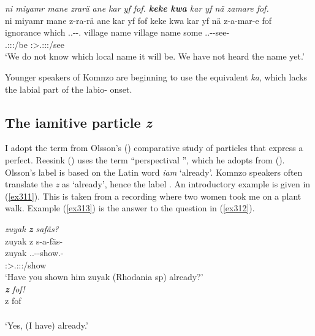 \begin{exe}
	\ex \emph{ni miyamr mane zrarä ane kar yf fof. \textbf{keke kwa} kar yf nä zamare fof.}\\
	\glll ni miyamr mane z-ra-rä ane kar yf fof keke kwa kar yf nä z-a-mar-e fof\\
	\Fnsg{} ignorance which \Tsg.\F.\Bet-\Irr-\Cop.\Ndu{} \Dem{} village name \Emph{} \Neg{} \Fut{} village name some \Tsg.\F.\Gam-\Ndu-see-\Fnsg{} \Emph{}\\
	{} {} {} \footnotesize{\Tsg.\F:\Sbj:\Irr:\Ipfv/be} {} {} {} {} {} {} {} {} {} \footnotesize{\Fpl:\Sbj>\Tsg.\F:\Obj:\Rpst:\Pfv/see} {}\\
	\trans `We do not know which local name it will be. We have not heard the name yet.'
	\label{ex367}
\end{exe}

Younger speakers of Komnzo are beginning to use the  equivalent \emph{ka}, which lacks the labial part of the labio- onset.

\subsection{The iamitive particle \emph{z}}\label{iamitivez}

I adopt the term  from Olsson's (\citeyear{Olsson:2013vn}) comparative study of particles that express a perfect. Reesink (\citeyear[184]{Reesink:2009bird}) uses the term ``perspectival '', which he adopts from (\citealt{Dik:1997uj}). Olsson's label is based on the Latin word \emph{iam} `already'. Komnzo speakers often translate the   \emph{z} as `already', hence the  label \Iam{}. An introductory example is given in (\ref{ex311}). This is taken from a recording where two women took me on a plant walk. Example (\ref{ex313}) is the answer to the question in (\ref{ex312}).

\begin{exe}
\ex \label{ex311}
\begin{xlist}
	\ex \emph{zuyak \textbf{z} safäs?}\\
	\glll zuyak z s-a-fäs-\Zero{}\\
	zuyak \Iam{} \Tsg.\Masc.\Gam-\Ndu-show.\Rs-\Stsg{}\\
	{} {} \footnotesize{\Stsg:\Sbj>\Tsg.\Masc:\Obj:\Nonpast:\Pfv/show}\\
	\trans `Have you shown him zuyak (Rhodania sp) already?'\\
	\label{ex312}
	\ex \emph{\textbf{z} fof!}\\
	\gll z fof\\
	\Iam{} \Emph{}\\
	\trans `Yes, (I have) already.'
	\label{ex313}
\end{xlist}
\end{exe}

